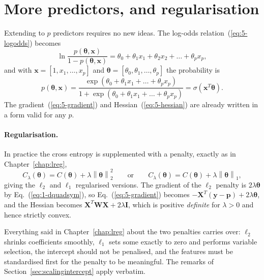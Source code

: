 \section{More predictors, and regularisation}
\label{sec:logregpenalty}

Extending to $p$ predictors requires no new ideas.  The log-odds
relation~(\ref{eq:5-logodds}) becomes
\begin{equation}
  \ln\frac{p(\bm{\theta},\bm{x})}{1-p(\bm{\theta},\bm{x})}
   = \theta_0 + \theta_1x_1 + \theta_2x_2 + \dots + \theta_px_p,
  \label{eq:5-multilogodds}
\end{equation}
and with $\bm{x}=[1,x_1,\dots,x_p]$ and
$\bm{\theta}=[\theta_0,\theta_1,\dots,\theta_p]$ the probability is
\begin{equation}
  p(\bm{\theta},\bm{x})
   = \frac{\exp\left(\theta_0+\theta_1x_1+\dots+\theta_px_p\right)}
          {1+\exp\left(\theta_0+\theta_1x_1+\dots+\theta_px_p\right)}
   = \sigma\!\left(\bm{x}^{T}\bm{\theta}\right).
  \label{eq:5-multip}
\end{equation}
The gradient~(\ref{eq:5-gradient}) and Hessian~(\ref{eq:5-hessian}) are
already written in a form valid for any $p$.

\paragraph{Regularisation.}
In practice the cross entropy is supplemented with a penalty, exactly as in
Chapter~\ref{chap:lreg},
\begin{equation}
  C_{\lambda}(\bm{\theta}) = C(\bm{\theta})
    + \lambda\left\|\bm{\theta}\right\|_2^{2}
  \qquad\text{or}\qquad
  C_{\lambda}(\bm{\theta}) = C(\bm{\theta})
    + \lambda\left\|\bm{\theta}\right\|_1,
  \label{eq:5-penalised}
\end{equation}
giving the $\ell_2$ and $\ell_1$ regularised versions.  The gradient of the
$\ell_2$ penalty is $2\lambda\bm{\theta}$ by Eq.~(\ref{eq:1-dquadsym}), so
Eq.~(\ref{eq:5-gradient}) becomes
$-\bm{X}^{T}(\bm{y}-\bm{p})+2\lambda\bm{\theta}$, and the Hessian becomes
$\bm{X}^{T}\bm{W}\bm{X}+2\lambda\bm{I}$, which is positive \emph{definite} for
$\lambda>0$ and hence strictly convex.

Everything said in Chapter~\ref{chap:lreg} about the two penalties carries
over: $\ell_2$ shrinks coefficients smoothly, $\ell_1$ sets some exactly to
zero and performs variable selection, the intercept should not be penalised,
and the features must be standardised first for the penalty to be meaningful.
The remarks of Section~\ref{sec:scalingintercept} apply verbatim.

